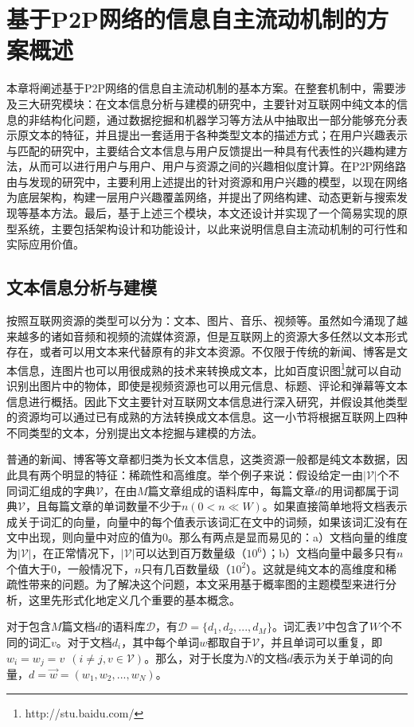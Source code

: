 \section{基于P2P网络的信息自主流动机制的方案概述}
本章将阐述基于P2P网络的信息自主流动机制的基本方案。在整套机制中，需要涉及三大研究模块：在文本信息分析与建模的研究中，主要针对互联网中纯文本的信息的非结构化问题，通过数据挖掘和机器学习等方法从中抽取出一部分能够充分表示原文本的特征，并且提出一套适用于各种类型文本的描述方式；在用户兴趣表示与匹配的研究中，主要结合文本信息与用户反馈提出一种具有代表性的兴趣构建方法，从而可以进行用户与用户、用户与资源之间的兴趣相似度计算。在P2P网络路由与发现的研究中，主要利用上述提出的针对资源和用户兴趣的模型，以现在网络为底层架构，构建一层用户兴趣覆盖网络，并提出了网络构建、动态更新与搜索发现等基本方法。最后，基于上述三个模块，本文还设计并实现了一个简易实现的原型系统，主要包括架构设计和功能设计，以此来说明信息自主流动机制的可行性和实际应用价值。

\subsection{文本信息分析与建模}
按照互联网资源的类型可以分为：文本、图片、音乐、视频等。虽然如今涌现了越来越多的诸如音频和视频的流媒体资源，但是互联网上的资源大多任然以文本形式存在，或者可以用文本来代替原有的非文本资源。不仅限于传统的新闻、博客是文本信息，连图片也可以用很成熟的技术来转换成文本，比如百度识图\footnote{http://stu.baidu.com/}就可以自动识别出图片中的物体，即使是视频资源也可以用元信息、标题、评论和弹幕等文本信息进行概括。因此下文主要针对互联网文本信息进行深入研究，并假设其他类型的资源均可以通过已有成熟的方法转换成文本信息。这一小节将根据互联网上四种不同类型的文本，分别提出文本挖掘与建模的方法。

普通的新闻、博客等文章都归类为长文本信息，这类资源一般都是纯文本数据，因此具有两个明显的特征：稀疏性和高维度。举个例子来说：假设给定一由$|\mathcal{V}|$个不同词汇组成的字典$\mathcal{V}$，在由$M$篇文章组成的语料库中，每篇文章$d$的用词都属于词典$\mathcal{V}$，且每篇文章的单词数量不少于$n (0<n\ll W)$。如果直接简单地将文档表示成关于词汇的向量，向量中的每个值表示该词汇在文中的词频，如果该词汇没有在文中出现，则向量中对应的值为0。那么有两点是显而易见的：a）文档向量的维度为$|\mathcal{V}|$，在正常情况下，$|\mathcal{V}|$可以达到百万数量级（$10^6$）；b）文档向量中最多只有$n$个值大于0，一般情况下，$n$只有几百数量级（$10^2$）。这就是纯文本的高维度和稀疏性带来的问题。为了解决这个问题，本文采用基于概率图的主题模型来进行分析，这里先形式化地定义几个重要的基本概念。

对于包含$M$篇文档$d$的语料库$\mathcal{D}$，有$\mathcal{D}=\{d_1,d_2,...,d_M\}$。词汇表$\mathcal{V}$中包含了$W$个不同的词汇$v$。对于文档$d_i$，其中每个单词$w$都取自于$\mathcal{V}$，并且单词可以重复，即$w_i=w_j=v~~(i\ne j, v\in \mathcal{V})$。那么，对于长度为$N$的文档$d$表示为关于单词的向量，$d=\vec{w}=(w_1,w_2,...,w_N)$。

